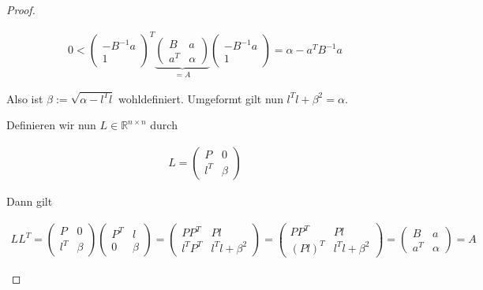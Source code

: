 \documentclass[]{article}
\begin{document}
\begin{proof}
\begin{itemize}
		\begin{align*}
			0 < \begin{pmatrix}
				-B^{-1}a\\
				1
			\end{pmatrix}^T
			\underbrace{\begin{pmatrix}
				B & a\\
				a^T & \alpha
			\end{pmatrix}}_{=A}
			\begin{pmatrix}
				-B^{-1}a\\
				1
			\end{pmatrix} =
			\alpha - a^T B^{-1} a
		\end{align*}
	
		Also ist $\beta := \sqrt{\alpha - l^Tl}$ wohldefiniert. Umgeformt gilt nun $l^Tl + \beta^2 = \alpha$.
		
		Definieren wir nun $L \in \mathbb{R}^{n\times n}$ durch
		
		\begin{align*}
			L = \begin{pmatrix}
				P & 0 \\
				l^T & \beta
			\end{pmatrix}
		\end{align*}
	
		Dann gilt
		
		\begin{align*}
			LL^T = \begin{pmatrix}
				P & 0 \\
				l^T & \beta
			\end{pmatrix} \begin{pmatrix}
				P^T & l \\
				0 & \beta
			\end{pmatrix} = \begin{pmatrix}
				PP^T & Pl \\
				l^TP^T & l^Tl+\beta^2
			\end{pmatrix} = \begin{pmatrix}
				PP^T & Pl \\
				(Pl)^T & l^Tl+\beta^2
			\end{pmatrix} = \begin{pmatrix}
				B & a \\
				a^T & \alpha
			\end{pmatrix} = A
		\end{align*}
	\end{itemize}
	
\end{proof}
\end{document}
